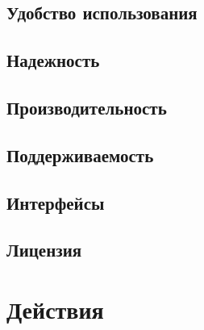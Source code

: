 \documentclass{article}
\begin{document}
  \subsection{Удобство использования}
  

  \subsection{Надежность}
  

  \subsection{Производительность}
  

  \subsection{Поддерживаемость}
  

  \subsection{Интерфейсы}
  

  \subsection{Лицензия}
  

\section{Действия}

\end{document}
